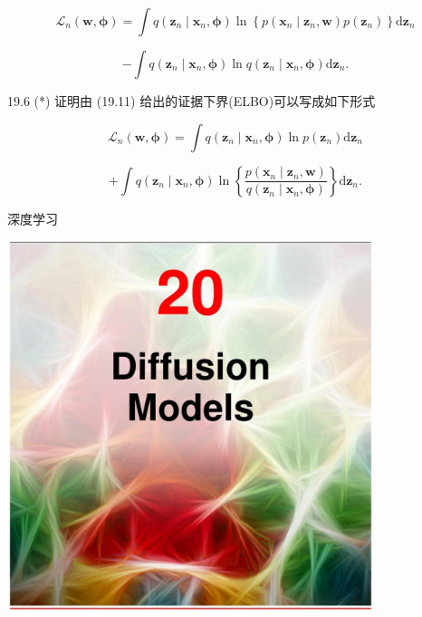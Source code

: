 \documentclass[10pt]{report}
\begin{document}
\[
{\mathcal{L}}_{n}\left( {\mathbf{w},\mathbf{\phi }}\right)  = \int q\left( {{\mathbf{z}}_{n} \mid  {\mathbf{x}}_{n},\mathbf{\phi }}\right) \ln \left\{  {p\left( {{\mathbf{x}}_{n} \mid  {\mathbf{z}}_{n},\mathbf{w}}\right) p\left( {\mathbf{z}}_{n}\right) }\right\}  \mathrm{d}{\mathbf{z}}_{n}
\]

\[
- \int q\left( {{\mathbf{z}}_{n} \mid  {\mathbf{x}}_{n},\mathbf{\phi }}\right) \ln q\left( {{\mathbf{z}}_{n} \mid  {\mathbf{x}}_{n},\mathbf{\phi }}\right) \mathrm{d}{\mathbf{z}}_{n}. \tag{19.24}
\]

19.6 (*) 证明由 (19.11) 给出的证据下界(ELBO)可以写成如下形式

\[
{\mathcal{L}}_{n}\left( {\mathbf{w},\mathbf{\phi }}\right)  = \int q\left( {{\mathbf{z}}_{n} \mid  {\mathbf{x}}_{n},\mathbf{\phi }}\right) \ln p\left( {\mathbf{z}}_{n}\right) \mathrm{d}{\mathbf{z}}_{n}
\]

\[
+ \int q\left( {{\mathbf{z}}_{n} \mid  {\mathbf{x}}_{n},\mathbf{\phi }}\right) \ln \left\{  \frac{p\left( {{\mathbf{x}}_{n} \mid  {\mathbf{z}}_{n},\mathbf{w}}\right) }{q\left( {{\mathbf{z}}_{n} \mid  {\mathbf{x}}_{n},\mathbf{\phi }}\right) }\right\}  \mathrm{d}{\mathbf{z}}_{n}. \tag{19.25}
\]

深度学习

\begin{center}
\includegraphics[max width=0.8\textwidth]{images/0194e279-9b28-703a-88f4-c3ac21e2010d_600_474_351_1074_1086_0.jpg}
\end{center}
\hspace*{3em} 
\end{document}

